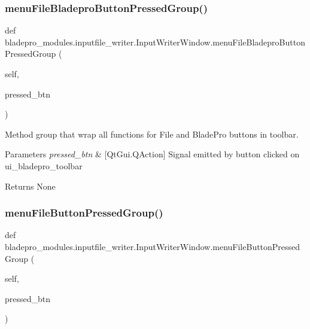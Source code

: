 \subsubsection{\texorpdfstring{menu\+File\+Bladepro\+Button\+Pressed\+Group()}{menuFileBladeproButtonPressedGroup()}}
{\footnotesize\ttfamily def bladepro\+\_\+modules.\+inputfile\+\_\+writer.\+Input\+Writer\+Window.\+menu\+File\+Bladepro\+Button\+Pressed\+Group (\begin{DoxyParamCaption}\item[{}]{self,  }\item[{}]{pressed\+\_\+btn }\end{DoxyParamCaption})}



Method group that wrap all functions for File and Blade\+Pro buttons in toolbar. 


\begin{DoxyParams}{Parameters}
{\em pressed\+\_\+btn} & \mbox{[}Qt\+Gui.\+Q\+Action\mbox{]} Signal emitted by button clicked on ui\+\_\+bladepro\+\_\+toolbar \\
\hline
\end{DoxyParams}
\begin{DoxyReturn}{Returns}
None 
\end{DoxyReturn}
\hypertarget{classbladepro__modules_1_1inputfile__writer_1_1_input_writer_window_a35cf87c6230239ce47b33bda03bd7432}{}\label{classbladepro__modules_1_1inputfile__writer_1_1_input_writer_window_a35cf87c6230239ce47b33bda03bd7432} 
\subsubsection{\texorpdfstring{menu\+File\+Button\+Pressed\+Group()}{menuFileButtonPressedGroup()}}
{\footnotesize\ttfamily def bladepro\+\_\+modules.\+inputfile\+\_\+writer.\+Input\+Writer\+Window.\+menu\+File\+Button\+Pressed\+Group (\begin{DoxyParamCaption}\item[{}]{self,  }\item[{}]{pressed\+\_\+btn }\end{DoxyParamCaption})}



